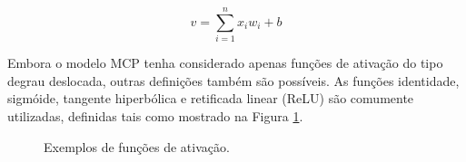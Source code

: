 \begin{equation}
  \label{eq:soma-ponderada}
  v = \sum\limits_{i=1}^n x_i w_i + b
\end{equation}



Embora o modelo MCP tenha considerado apenas funções de ativação do tipo degrau deslocada, outras definições também são possíveis. As funções identidade, sigmóide, tangente hiperbólica e retificada linear (ReLU) são comumente utilizadas, definidas tais como mostrado na Figura \ref{fig:activation}.

\begin{figure}[h!]
  \caption{Exemplos de funções de ativação.}
  \label{fig:activation}
     \hfill
     \hfill
     \hfill
\end{figure}



